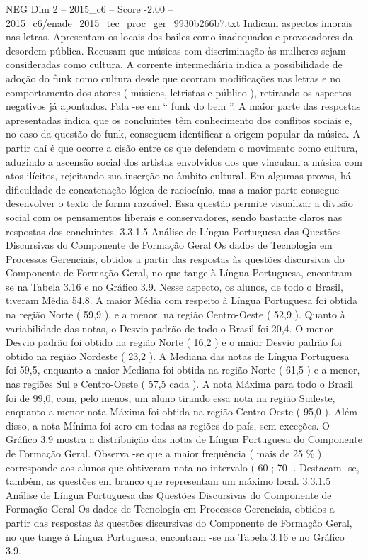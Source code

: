 \begin{textsample}{NEG Dim 2 – 2015\_c6 – Score -2.00 – 2015\_c6/enade\_2015\_tec\_proc\_ger\_9930b266b7.txt}
Indicam aspectos imorais nas letras.
Apresentam os locais dos bailes como inadequados e provocadores da desordem pública.
Recusam que músicas com discriminação às mulheres sejam consideradas como cultura.
A corrente intermediária indica a possibilidade de adoção do funk como cultura desde que ocorram modificações nas letras e no comportamento dos atores ( músicos, letristas e público ), retirando os aspectos negativos já apontados.
Fala -se em “ funk do bem ”.
A maior parte das respostas apresentadas indica que os concluintes têm conhecimento dos conflitos sociais e, no caso da questão do funk, conseguem identificar a origem popular da música.
A partir daí é que ocorre a cisão entre os que defendem o movimento como cultura, aduzindo a ascensão social dos artistas envolvidos dos que vinculam a música com atos ilícitos, rejeitando sua inserção no âmbito cultural.
Em algumas provas, há dificuldade de concatenação lógica de raciocínio, mas a maior parte consegue desenvolver o texto de forma razoável.
Essa questão permite visualizar a divisão social com os pensamentos liberais e conservadores, sendo bastante claros nas respostas dos concluintes. 3.3.1.5 Análise de Língua Portuguesa das Questões Discursivas do Componente de Formação Geral Os dados de Tecnologia em Processos Gerenciais, obtidos a partir das respostas às questões discursivas do Componente de Formação Geral, no que tange à Língua Portuguesa, encontram -se na Tabela 3.16 e no Gráfico 3.9.
Nesse aspecto, os alunos, de todo o Brasil, tiveram Média 54,8.
A maior Média com respeito à Língua Portuguesa foi obtida na região Norte ( 59,9 ), e a menor, na região Centro-Oeste ( 52,9 ).
Quanto à variabilidade das notas, o Desvio padrão de todo o Brasil foi 20,4.
O menor Desvio padrão foi obtido na região Norte ( 16,2 ) e o maior Desvio padrão foi obtido na região Nordeste ( 23,2 ).
A Mediana das notas de Língua Portuguesa foi 59,5, enquanto a maior Mediana foi obtida na região Norte ( 61,5 ) e a menor, nas regiões Sul e Centro-Oeste ( 57,5 cada ).
A nota Máxima para todo o Brasil foi de 99,0, com, pelo menos, um aluno tirando essa nota na região Sudeste, enquanto a menor nota Máxima foi obtida na região Centro-Oeste ( 95,0 ).
Além disso, a nota Mínima foi zero em todas as regiões do país, sem exceções.
O Gráfico 3.9 mostra a distribuição das notas de Língua Portuguesa do Componente de Formação Geral.
Observa -se que a maior frequência ( mais de 25 \% ) corresponde aos alunos que obtiveram nota no intervalo ( 60 ; 70 ].
Destacam -se, também, as questões em branco que representam um máximo local. 3.3.1.5 Análise de Língua Portuguesa das Questões Discursivas do Componente de Formação Geral Os dados de Tecnologia em Processos Gerenciais, obtidos a partir das respostas às questões discursivas do Componente de Formação Geral, no que tange à Língua Portuguesa, encontram -se na Tabela 3.16 e no Gráfico 3.9.

\end{textsample}
